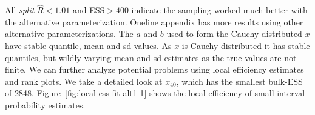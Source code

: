 \documentclass[american,]{article}
\begin{document}

All \emph{split}-\(\widehat{R}<1.01\) and ESS\(>400\) indicate the
sampling worked much better with the alternative parameterization.
Oneline appendix has more results using other
alternative parameterizations. The \(a\) and \(b\) used
to form the Cauchy distributed \(x\) have stable quantile, mean and
sd values. As \(x\) is Cauchy distributed it has stable
quantiles, but wildly varying mean and sd estimates as the true values
are not finite.
%
We can further analyze potential problems using local efficiency
estimates and rank plots. We take a detailed look at \(x_{40}\), which
has the smallest bulk-ESS of 2848.
%
Figure~\ref{fig:local-ess-fit-alt1-1} shows
the local efficiency of small interval probability estimates.
\end{document}
